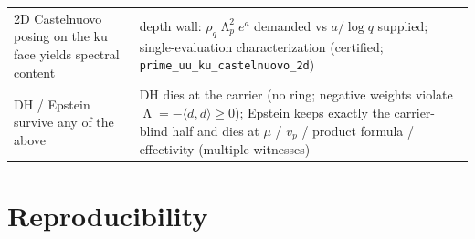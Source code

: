 \documentclass[11pt,reqno]{amsart}
\theoremstyle{plain}
\theoremstyle{definition}
\theoremstyle{remark}
\newcommand{\ku}{\mathrm{ku}}
\DeclareMathOperator{\Lam}{\Lambda}
\begin{document}
\begin{center}
\begin{tabular}{>{\raggedright\arraybackslash}p{} >{\raggedright\arraybackslash}p{}}
2D Castelnuovo posing on the $\ku$ face yields spectral content &
depth wall: $\rho_q\Lam_p^2 e^{a}$ demanded vs $a/\log q$ supplied; single-evaluation
characterization (certified; \texttt{prime\_\allowbreak uu\_\allowbreak ku\_\allowbreak castelnuovo\_\allowbreak 2d}) \\[2pt]
DH / Epstein survive any of the above &
DH dies at the carrier (no ring; negative weights violate
$\Lam = -\langle d,d\rangle \ge 0$); Epstein keeps exactly the carrier-blind half and dies at
$\mu$ / $v_p$ / product formula / effectivity (multiple witnesses) \\
\bottomrule
\end{tabular}
\end{center}

\section{Reproducibility}\label{app:repro}
\end{document}
